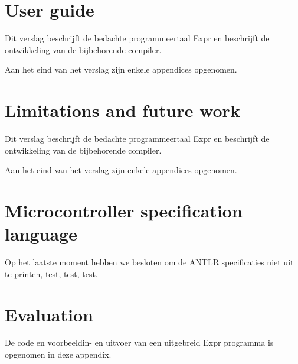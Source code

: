 \documentclass[a4paper]{report}
\begin{document}
\chapter{User guide}
Dit verslag beschrijft de bedachte programmeertaal Expr en beschrijft de
ontwikkeling van de bijbehorende compiler.

Aan het eind van het verslag zijn enkele appendices opgenomen. 

\chapter{Limitations and future work}
Dit verslag beschrijft de bedachte programmeertaal Expr en beschrijft de
ontwikkeling van de bijbehorende compiler.

Aan het eind van het verslag zijn enkele appendices opgenomen. 


\clearpage
{}


\appendix
\chapter[Grammar explanation]{Microcontroller specification language}
Op het laatste moment hebben we besloten om de ANTLR specificaties niet
uit te printen, test, test, test.

\chapter[Evaluation]{Evaluation}
De code en voorbeeldin- en uitvoer van een uitgebreid Expr programma is
\cite{atmelISA} opgenomen in deze appendix.
\end{document}
